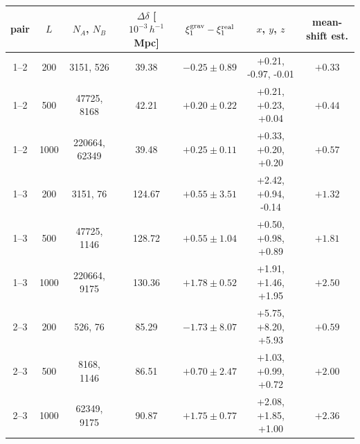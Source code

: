 \begin{tabular}{ccccccc}
\toprule
pair & $L$ & $N_A$, $N_B$ & $\Delta\delta$ [$10^{-3}\,h^{-1}$Mpc] & $\xi_1^{\rm grav}-\xi_1^{\rm real}$ & $x$, $y$, $z$ & mean-shift est. \\
\midrule
1–2 & 200 & 3151, 526 & 39.38 & $-0.25 \pm 0.89$ & +0.21, -0.97, -0.01 & $+0.33$ \\
1–2 & 500 & 47725, 8168 & 42.21 & $+0.20 \pm 0.22$ & +0.21, +0.23, +0.04 & $+0.44$ \\
1–2 & 1000 & 220664, 62349 & 39.48 & $+0.25 \pm 0.11$ & +0.33, +0.20, +0.20 & $+0.57$ \\
\midrule
1–3 & 200 & 3151, 76 & 124.67 & $+0.55 \pm 3.51$ & +2.42, +0.94, -0.14 & $+1.32$ \\
1–3 & 500 & 47725, 1146 & 128.72 & $+0.55 \pm 1.04$ & +0.50, +0.98, +0.89 & $+1.81$ \\
1–3 & 1000 & 220664, 9175 & 130.36 & $+1.78 \pm 0.52$ & +1.91, +1.46, +1.95 & $+2.50$ \\
\midrule
2–3 & 200 & 526, 76 & 85.29 & $-1.73 \pm 8.07$ & +5.75, +8.20, +5.93 & $+0.59$ \\
2–3 & 500 & 8168, 1146 & 86.51 & $+0.70 \pm 2.47$ & +1.03, +0.99, +0.72 & $+2.00$ \\
2–3 & 1000 & 62349, 9175 & 90.87 & $+1.75 \pm 0.77$ & +2.08, +1.85, +1.00 & $+2.36$ \\
\bottomrule
\end{tabular}
